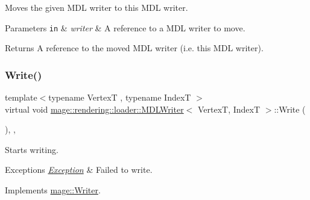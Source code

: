 Moves the given M\+DL writer to this M\+DL writer.


\begin{DoxyParams}[1]{Parameters}
\mbox{\tt in}  & {\em writer} & A reference to a M\+DL writer to move. \\
\hline
\end{DoxyParams}
\begin{DoxyReturn}{Returns}
A reference to the moved M\+DL writer (i.\+e. this M\+DL writer). 
\end{DoxyReturn}
\mbox{\label{classmage_1_1rendering_1_1loader_1_1_m_d_l_writer_a1506b1a09c7a7c1ee1e206cc6d5cd0e0}} 
\subsubsection{\texorpdfstring{Write()}{Write()}}
{\footnotesize\ttfamily template$<$typename VertexT , typename IndexT $>$ \\
virtual void \mbox{\hyperlink{classmage_1_1rendering_1_1loader_1_1_m_d_l_writer}{mage\+::rendering\+::loader\+::\+M\+D\+L\+Writer}}$<$ VertexT, IndexT $>$\+::Write (\begin{DoxyParamCaption}{ }\end{DoxyParamCaption})\hspace{0.3cm}{\ttfamily [override]}, {\ttfamily [private]}, {\ttfamily [virtual]}}

Starts writing.


\begin{DoxyExceptions}{Exceptions}
{\em \mbox{\hyperlink{classmage_1_1_exception}{Exception}}} & Failed to write. \\
\hline
\end{DoxyExceptions}


Implements \mbox{\hyperlink{classmage_1_1_writer_a9baf695ef7f6180bef883f60bcb3ac07}{mage\+::\+Writer}}.

\mbox{\label{classmage_1_1rendering_1_1loader_1_1_m_d_l_writer_afcd1eca27b5854b0f0406dbcae135499}} 

